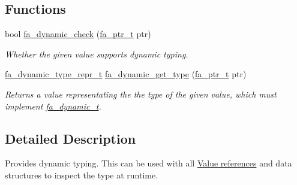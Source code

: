 \subsection*{Functions}
\begin{DoxyCompactItemize}
\item 
bool \hyperlink{group___fa_dynamic_ga98007c81126e3255272875dd53ea0e10}{fa\-\_\-dynamic\-\_\-check} (\hyperlink{group___fa_ga915ddeae99ad7568b273d2b876425197}{fa\-\_\-ptr\-\_\-t} ptr)
\begin{DoxyCompactList}\small\item\em Whether the given value supports dynamic typing. \end{DoxyCompactList}\item 
\hyperlink{group___fa_dynamic_ga38427e999172dad2684f07793859f416}{fa\-\_\-dynamic\-\_\-type\-\_\-repr\-\_\-t} \hyperlink{group___fa_dynamic_ga75682ebb43d63500c11d24909c84c6ba}{fa\-\_\-dynamic\-\_\-get\-\_\-type} (\hyperlink{group___fa_ga915ddeae99ad7568b273d2b876425197}{fa\-\_\-ptr\-\_\-t} ptr)
\begin{DoxyCompactList}\small\item\em Returns a value representating the the type of the given value, which must implement \hyperlink{structfa__dynamic__t}{fa\-\_\-dynamic\-\_\-t}. \end{DoxyCompactList}\end{DoxyCompactItemize}


\subsection{Detailed Description}
Provides dynamic typing. This can be used with all \hyperlink{md__data_structures_ValueReferences}{Value references} and data structures to inspect the type at runtime. 

